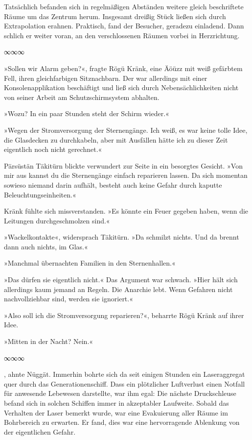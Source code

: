 Tatsächlich befanden sich in regelmäßigen Abständen weitere gleich beschriftete Räume um das Zentrum herum. Insgesamt dreißig Stück ließen sich durch Extrapolation erahnen. Praktisch, fand der Besucher, geradezu einladend. Dann schlich er weiter voran, an den verschlossenen Räumen vorbei in Herzrichtung.

\begin{center}
∞∞∞
\end{center}

»Sollen wir Alarm geben?«, fragte Rögü Kränk, eine Äöüzz mit weiß gefärbtem Fell, ihren gleichfarbigen Sitznachbarn. Der war allerdings mit einer Konsolenapplikation beschäftigt und ließ sich durch Nebensächlichkeiten nicht von seiner Arbeit am Schutzschirmsystem abhalten.

»Wozu? In ein paar Stunden steht der Schirm wieder.«

»Wegen der Stromversorgung der Sternengänge. Ich weiß, es war keine tolle Idee, die Glasdecken zu durchkabeln, aber mit Ausfällen hätte ich zu dieser Zeit eigentlich noch nicht gerechnet.«

Pärsüstän Täkitürn blickte verwundert zur Seite in ein besorgtes Gesicht. »Von mir aus kannst du die Sternengänge einfach reparieren lassen. Da sich momentan sowieso niemand darin aufhält, besteht auch keine Gefahr durch kaputte Beleuchtungseinheiten.«

Kränk fühlte sich missverstanden. »Es könnte ein Feuer gegeben haben, wenn die Leitungen durchgeschmolzen sind.«

»Wackelkontakte«, widersprach Täkitürn. »Da schmilzt nichts. Und da brennt dann auch nichts, im Glas.«

»Manchmal übernachten Familien in den Sternenhallen.«

»Das dürfen sie eigentlich nicht.« Das Argument war schwach. »Hier hält sich allerdings kaum jemand an Regeln. Die Anarchie lebt. Wenn Gefahren nicht nachvollziehbar sind, werden sie ignoriert.«

»Also soll ich die Stromversorgung reparieren?«, beharrte Rögü Kränk auf ihrer Idee.

»Mitten in der Nacht? Nein.«

\begin{center}
∞∞∞
\end{center}

, ahnte Nüggät. Immerhin bohrte sich da seit einigen Stunden ein Laseraggregat quer durch das Generationenschiff. Dass ein plötzlicher Luftverlust einen Notfall für anwesende Lebewesen darstellte, war ihm egal: Die nächste Druckschleuse befand sich in solchen Schiffen immer in akzeptabler Laufweite. Sobald das Verhalten der Laser bemerkt wurde, war eine Evakuierung aller Räume im Bohrbereich zu erwarten. Er fand, dies war eine hervorragende Ablenkung von der eigentlichen Gefahr.


